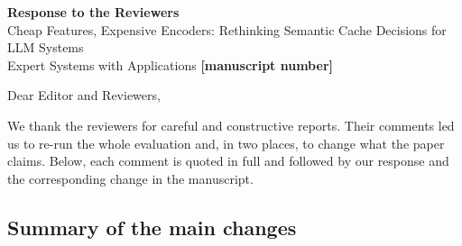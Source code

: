 \documentclass[11pt]{article}
\newcounter{reviewer}
\newcommand{\pending}[1]{{\color{red}\textbf{[#1]}}}
\begin{document}
\begin{center}
{\Large\bfseries Response to the Reviewers}\\[4pt]
Cheap Features, Expensive Encoders: Rethinking Semantic Cache Decisions for LLM Systems\\
Expert Systems with Applications \pending{manuscript number}
\end{center}

Dear Editor and Reviewers,

We thank the reviewers for careful and constructive reports. Their comments led us to re-run the whole
evaluation and, in two places, to change what the paper claims. Below, each comment is quoted in full and
followed by our response and the corresponding change in the manuscript.

\subsection*{Summary of the main changes}
\end{document}
